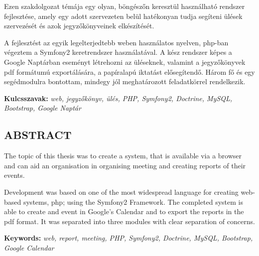 \documentclass[a4paper,12pt,oneside]{report}
\begin{document}
Ezen szakdolgozat témája egy olyan, böngészőn keresztül használható rendszer fejlesztése, amely egy adott szervezeten belül hatékonyan tudja segíteni ülések szervezését és azok jegyzőkönyveinek elkészítését.

A fejlesztést az egyik legelterjedtebb weben használatos nyelven, php-ban végeztem a Symfony2 keretrendszer használatával. A kész rendszer képes a Google Naptárban eseményt létrehozni az üléseknek, valamint a jegyzőkönyvek pdf formátumú exportálására, a papíralapú iktatást elősegítendő. Három fő és egy segédmodulra bontottam, mindegy jól meghatározott feladatkörrel rendelkezik.

\vspace{2cm}

{\bf Kulcsszavak:} {\it web, jegyzőkönyv, ülés, PHP, Symfony2, Doctrine, MySQL, Bootstrap, Google Naptár}
\newpage

\newpage

\begin{center}
\section*{\textbf{\Large \MakeUppercase{Abstract}}}
\end{center}

The topic of this thesis was to create a system, that is available via a browser and can aid an organisation in organising meeting and creating reports of their events.

Development was based on one of the most widespread language for creating web-based systems, php; using the Symfony2 Framework. The completed system is able to create and event in Google's Calendar and to export the reports in the pdf format. It was separated into three modules with clear separation of concerns.

\vspace{2cm}

{\bf Keywords:} {\it web, report, meeting, PHP, Symfony2, Doctrine, MySQL, Bootstrap, Google Calendar}
\newpage

\renewcommand{\thefigure}{\arabic{figure}}

\setcounter{tocdepth}{3} %
\thispagestyle{empty}
\tableofcontents
\pagebreak

\setcounter{page}{1} %
\pagestyle{plain}
\fancyhead[C]{\rightmark}
\fancyfoot[R]{\thepage}
\end{document}
